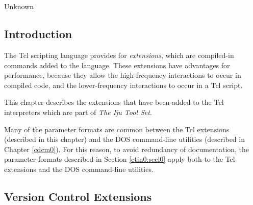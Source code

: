 \chapter[\cxtnzeroshorttitle{}]{\cxtnzerolongtitle{}}

\label{cxtn0}

                   {Unknown}

\section{Introduction}
\label{cxtn0:sint0}

The Tcl scripting language provides for \emph{extensions}, which are
compiled-in commands added to the language.  These extensions have advantages
for performance, because they allow the high-frequency interactions to occur
in compiled code, and the lower-frequency interactions to occur in 
a Tcl script.

This chapter describes the extensions that have been added to the Tcl
interpreters which are part of \emph{The Iju Tool Set}.

Many of the parameter formats are common between the Tcl extensions
(described in this chapter) and the DOS command-line
utilities (described in Chapter
\ref{cdcm0}).  For this reason, to avoid
redundancy of documentation, the parameter formats described
in Section \ref{ctin0:sccl0} apply both to the 
Tcl extensions
and the DOS command-line utilities.



\section{Version Control Extensions}


